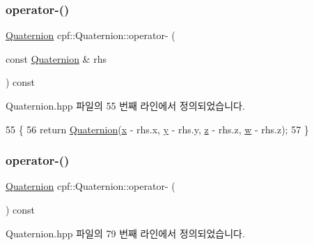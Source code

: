 \subsubsection{\texorpdfstring{operator-\/()}{operator-()}\hspace{0.1cm}{\footnotesize\ttfamily [1/2]}}
{\footnotesize\ttfamily \hyperlink{classcpf_1_1_quaternion}{Quaternion} cpf\+::\+Quaternion\+::operator-\/ (\begin{DoxyParamCaption}\item[{const \hyperlink{classcpf_1_1_quaternion}{Quaternion} \&}]{rhs }\end{DoxyParamCaption}) const\hspace{0.3cm}{\ttfamily [inline]}}



Quaternion.\+hpp 파일의 55 번째 라인에서 정의되었습니다.


\begin{DoxyCode}
55                                                           \{
56             \textcolor{keywordflow}{return} \hyperlink{classcpf_1_1_quaternion_aae3cc98fcdb7a419a29db4ee988972bc}{Quaternion}(\hyperlink{classcpf_1_1_quaternion_a200f7bce4e673281af8cc7dd75cb0677}{x} - rhs.x, \hyperlink{classcpf_1_1_quaternion_a4fbade6e58be55a49c94e7f157988136}{y} - rhs.y, \hyperlink{classcpf_1_1_quaternion_ade9c41b717605118e5fdf95d96a843b4}{z} - rhs.z, \hyperlink{classcpf_1_1_quaternion_af312a196b39bb4903b876bc454ac15f8}{w} - rhs.z);
57         \}
\end{DoxyCode}
\mbox{\label{classcpf_1_1_quaternion_a3334827293427e76daab54a9ab3ca2c3}} 
\subsubsection{\texorpdfstring{operator-\/()}{operator-()}\hspace{0.1cm}{\footnotesize\ttfamily [2/2]}}
{\footnotesize\ttfamily \hyperlink{classcpf_1_1_quaternion}{Quaternion} cpf\+::\+Quaternion\+::operator-\/ (\begin{DoxyParamCaption}{ }\end{DoxyParamCaption}) const\hspace{0.3cm}{\ttfamily [inline]}}



Quaternion.\+hpp 파일의 79 번째 라인에서 정의되었습니다.


